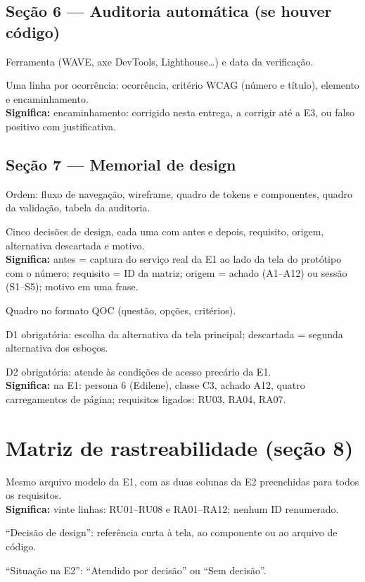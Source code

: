 \documentclass[11pt,a4paper]{article}
\newcommand{\obs}[1]{\\{\small\color{cinza}\textbf{Significa:} #1}}
\begin{document}
\subsection{Seção 6 --- Auditoria automática (se houver código)}
\begin{checks}
  \item Ferramenta (WAVE, axe DevTools, Lighthouse\ldots) e data da verificação.
  \item Uma linha por ocorrência: ocorrência, critério WCAG (número e título), elemento e encaminhamento.
    \obs{encaminhamento: corrigido nesta entrega, a corrigir até a E3, ou falso positivo com justificativa.}
\end{checks}

\subsection{Seção 7 --- Memorial de design}
\begin{checks}
  \item Ordem: fluxo de navegação, wireframe, quadro de tokens e componentes, quadro da validação, tabela da auditoria.
  \item Cinco decisões de design, cada uma com antes e depois, requisito, origem, alternativa descartada e motivo.
    \obs{antes = captura do serviço real da E1 ao lado da tela do protótipo com o número; requisito = ID da matriz; origem = achado (A1--A12) ou sessão (S1--S5); motivo em uma frase.}
  \item Quadro no formato QOC (questão, opções, critérios).
  \item D1 obrigatória: escolha da alternativa da tela principal; descartada = segunda alternativa dos esboços.
  \item D2 obrigatória: atende às condições de acesso precário da E1.
    \obs{na E1: persona 6 (Edilene), classe C3, achado A12, quatro carregamentos de página; requisitos ligados: RU03, RA04, RA07.}
\end{checks}

\section{Matriz de rastreabilidade (seção 8)}

\begin{checks}
  \item Mesmo arquivo modelo da E1, com as duas colunas da E2 preenchidas para todos os requisitos.
    \obs{vinte linhas: RU01--RU08 e RA01--RA12; nenhum ID renumerado.}
  \item ``Decisão de design'': referência curta à tela, ao componente ou ao arquivo de código.
  \item ``Situação na E2'': ``Atendido por decisão'' ou ``Sem decisão''.
\end{checks}
\end{document}
